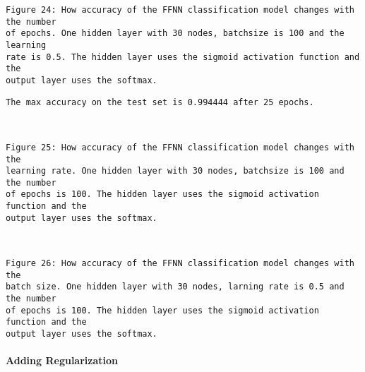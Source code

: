 \documentclass[11pt]{article}
\begin{document}
    \begin{Verbatim}[commandchars=\\\{\}]
Figure 24: How accuracy of the FFNN classification model changes with the number
of epochs. One hidden layer with 30 nodes, batchsize is 100 and the learning
rate is 0.5. The hidden layer uses the sigmoid activation function and the
output layer uses the softmax.
    \end{Verbatim}

    \begin{Verbatim}[commandchars=\\\{\}]
The max accuracy on the test set is 0.994444 after 25 epochs.
    \end{Verbatim}


    \begin{center}
    \end{center}
    { \hspace*{\fill} \\}
    
    \begin{Verbatim}[commandchars=\\\{\}]
Figure 25: How accuracy of the FFNN classification model changes with the
learning rate. One hidden layer with 30 nodes, batchsize is 100 and the number
of epochs is 100. The hidden layer uses the sigmoid activation function and the
output layer uses the softmax.
    \end{Verbatim}


    \begin{center}
    \end{center}
    { \hspace*{\fill} \\}
    
    \begin{Verbatim}[commandchars=\\\{\}]
Figure 26: How accuracy of the FFNN classification model changes with the
batch size. One hidden layer with 30 nodes, larning rate is 0.5 and the number
of epochs is 100. The hidden layer uses the sigmoid activation function and the
output layer uses the softmax.
    \end{Verbatim}

    \hypertarget{adding-regularization}{%
\paragraph{Adding Regularization}\label{adding-regularization}}
\end{document}
